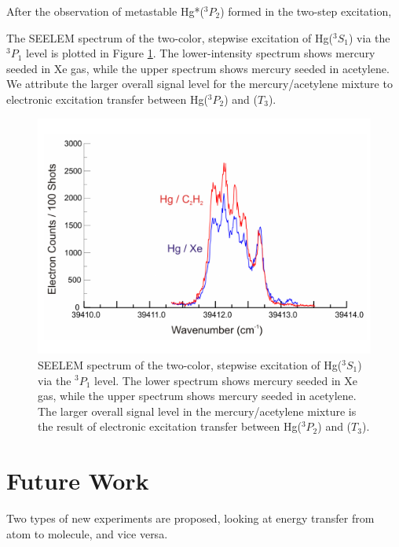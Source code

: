 \documentclass[12pt]{mitthesis}
\begin{document}
After the observation of metastable Hg*($^3P_2$) formed in the
two-step excitation, 

The SEELEM spectrum of the two-color, stepwise excitation of
Hg($^3S_1$) via the $^3P_1$ level is plotted in Figure
\ref{fig:hg-twostep-c2h2}.  The lower-intensity spectrum shows mercury
seeded in Xe gas, while the upper spectrum shows mercury seeded in
acetylene.  We attribute the larger overall signal level for the
mercury/acetylene mixture to electronic excitation transfer between
Hg($^3P_2$) and ($T_3$).

\begin{figure}
  \caption{SEELEM spectrum of the two-color, stepwise excitation of
    Hg($^3S_1$) via the $^3P_1$ level.  The lower spectrum shows
    mercury seeded in Xe gas, while the upper spectrum shows mercury
    seeded in acetylene.  The larger overall signal level in the
    mercury/acetylene mixture is the result of electronic excitation
    transfer between Hg($^3P_2$) and ($T_3$).}
  \label{fig:hg-twostep-c2h2}
  \centering
  \includegraphics[width=8in,angle=90]{hg-twostep-c2h2.pdf}
\end{figure}


\section{Future Work}

Two types of new experiments are proposed, looking at energy transfer
from atom to molecule, and vice versa.
\end{document}
